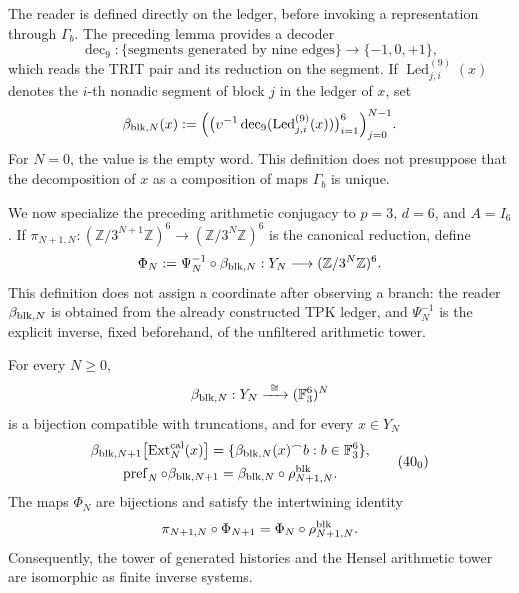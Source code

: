 The reader is defined directly on the ledger, before invoking a
representation through \(\Gamma_b\). The preceding lemma provides a
decoder
\[
 \operatorname{dec}_9:\{\text{segments generated by nine edges}\}
 \longrightarrow\{-1,0,+1\},
\]
which reads the TRIT pair and its reduction on the segment. If
\(\operatorname{Led}^{(9)}_{j,i}(x)\) denotes the \(i\)-th nonadic segment
of block \(j\) in the ledger of \(x\), set
\begin{equation}
 \beta_{{\rm blk},N}(x):=
 \Bigl(
   \bigl(\upsilon^{-1}\operatorname{dec}_9
          (\operatorname{Led}^{(9)}_{j,i}(x))\bigr)_{i=1}^{6}
 \Bigr)_{j=0}^{N-1}.
 \label{eq:lector-bloques-ch}
\end{equation}
For \(N=0\), the value is the empty word. This definition does not presuppose
that the decomposition of \(x\) as a composition of maps \(\Gamma_b\) is
unique.

We now specialize the preceding arithmetic conjugacy to
\(p=3\), \(d=6\), and \(A=I_6\). If
\(\pi_{N+1,N}:(\mathbb Z/3^{N+1}\mathbb Z)^6\to
(\mathbb Z/3^N\mathbb Z)^6\) is the canonical reduction, define
\begin{equation}
 \Phi_N:=\Psi_N^{-1}\circ\beta_{{\rm blk},N}:
 Y_N\longrightarrow(\mathbb Z/3^N\mathbb Z)^6.
 \label{eq:phi-hensel-bloques-ch}
\end{equation}
This definition does not assign a coordinate after observing a branch: the
reader \(\beta_{{\rm blk},N}\) is obtained from the already constructed TPK ledger, and
\(\Psi_N^{-1}\) is the explicit inverse, fixed beforehand, of the
unfiltered arithmetic tower.

\begin{proposition}
\label{prop:cobertura-729-seccion}
For every \(N\geq0\),
\[
 \beta_{{\rm blk},N}:Y_N\xrightarrow{\ \cong\ }
 (\mathbb F_3^6)^N
\]
is a bijection compatible with truncations, and for every \(x\in Y_N\)
\[
 \begin{gathered}
 \beta_{{\rm blk},N+1}
 \bigl[\operatorname{Ext}^{\rm cal}_N(x)\bigr]
 =\{\beta_{{\rm blk},N}(x)^\frown b:
       b\in\mathbb F_3^6\},\\
 \operatorname{pref}_N\circ\beta_{{\rm blk},N+1}
 =\beta_{{\rm blk},N}\circ\rho^{\rm blk}_{N+1,N}.
 \end{gathered}
\tag{40$_0$}
\label{eq:cobertura-729-ch}
\]
The maps \(\Phi_N\) are bijections and satisfy the intertwining identity
\begin{equation}
 \pi_{N+1,N}\circ\Phi_{N+1}
 =\Phi_N\circ\rho^{\rm blk}_{N+1,N}.
 \label{eq:entrelazamiento-hensel-ext-ch}
\end{equation}
Consequently, the tower of generated histories and the Hensel arithmetic
tower are isomorphic as finite inverse systems.
\end{proposition}

